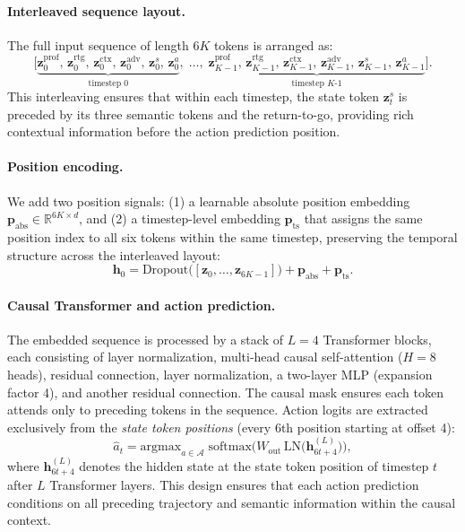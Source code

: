 \paragraph{Interleaved sequence layout.} The full input sequence of length $6K$ tokens is arranged as:
\begin{equation}
    \bigl[\underbrace{\mathbf{z}^{\text{prof}}_0,\, \mathbf{z}^{\text{rtg}}_0,\, \mathbf{z}^{\text{ctx}}_0,\, \mathbf{z}^{\text{adv}}_0,\, \mathbf{z}^{s}_0,\, \mathbf{z}^{a}_0}_{\text{timestep 0}},\;
    \ldots,\;
    \underbrace{\mathbf{z}^{\text{prof}}_{K-1},\, \mathbf{z}^{\text{rtg}}_{K-1},\, \mathbf{z}^{\text{ctx}}_{K-1},\, \mathbf{z}^{\text{adv}}_{K-1},\, \mathbf{z}^{s}_{K-1},\, \mathbf{z}^{a}_{K-1}}_{\text{timestep } K\text{-}1}\bigr].
\end{equation}
This interleaving ensures that within each timestep, the state token $\mathbf{z}^{s}_t$ is preceded by its three semantic tokens and the return-to-go, providing rich contextual information before the action prediction position.

\paragraph{Position encoding.} We add two position signals: (1) a learnable absolute position embedding $\mathbf{p}_{\text{abs}} \in \mathbb{R}^{6K \times d}$, and (2) a timestep-level embedding $\mathbf{p}_{\text{ts}}$ that assigns the same position index to all six tokens within the same timestep, preserving the temporal structure across the interleaved layout:
\begin{equation}
    \mathbf{h}_0 = \text{Dropout}\bigl([\mathbf{z}_0, \ldots, \mathbf{z}_{6K-1}]\bigr) + \mathbf{p}_{\text{abs}} + \mathbf{p}_{\text{ts}}.
\end{equation}

\paragraph{Causal Transformer and action prediction.} The embedded sequence is processed by a stack of $L = 4$ Transformer blocks, each consisting of layer normalization, multi-head causal self-attention ($H = 8$ heads), residual connection, layer normalization, a two-layer MLP (expansion factor 4), and another residual connection. The causal mask ensures each token attends only to preceding tokens in the sequence. Action logits are extracted exclusively from the \textit{state token positions} (every 6th position starting at offset 4):
\begin{equation}
    \hat{a}_t = \text{argmax}_{a \in \mathcal{A}} \; \text{softmax}\bigl(W_{\text{out}}\,\text{LN}\bigl(\mathbf{h}^{(L)}_{6t+4}\bigr)\bigr),
\end{equation}
where $\mathbf{h}^{(L)}_{6t+4}$ denotes the hidden state at the state token position of timestep $t$ after $L$ Transformer layers. This design ensures that each action prediction conditions on all preceding trajectory and semantic information within the causal context.

